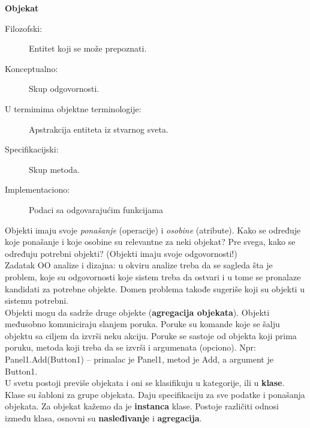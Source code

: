 \documentclass[../main.tex]{subfiles}
\begin{document}
{\bf Objekat}
\begin{description}
\item[Filozofski:] Entitet koji se može prepoznati.
\item[Konceptualno:] Skup odgovornosti.
\item[U termimima objektne terminologije:] Apstrakcija entiteta iz stvarnog sveta.
\item[Specifikacijski:] Skup metoda.
\item[Implementaciono:] Podaci sa odgovarajućim funkcijama
\end{description}

Objekti imaju svoje {\it ponašanje} (operacije) i {\it osobine} (atribute). Kako se određuje koje ponašanje i koje osobine su relevantne za neki objekat? Pre svega, kako se  određuju potrebni objekti? (Objekti imaju svoje odgovornosti!) 
\\
Zadatak OO analize i dizajna: u okviru analize treba da se sagleda šta je problem, koje su odgovornosti koje sistem treba da ostvari i u tome se pronalaze kandidati za potrebne objekte. Domen problema takođe sugeriše koji su objekti u sistemu potrebni. 
\\
Objekti mogu da sadrže druge objekte ({\bf agregacija objekata}). Objekti međusobno komuniciraju slanjem poruka. Poruke su komande koje se šalju objektu sa ciljem da izvrši neku akciju. Poruke se sastoje od objekta koji prima poruku, metoda koji treba da se izvrši i argumenata (opciono). Npr: Panel1.Add(Button1) -- primalac je Panel1, metod je Add, a argument je Button1.
\\
U svetu postoji previše objekata i oni se klasifikuju u kategorije, ili u {\bf klase}. Klase su šabloni za grupe objekata. Daju specifikaciju za sve podatke i ponašanja objekata. Za objekat kažemo da je {\bf instanca} klase. Postoje različiti odnosi između klasa, osnovni su {\bf nasleđivanje} i {\bf agregacija}.
\\
\end{document}
